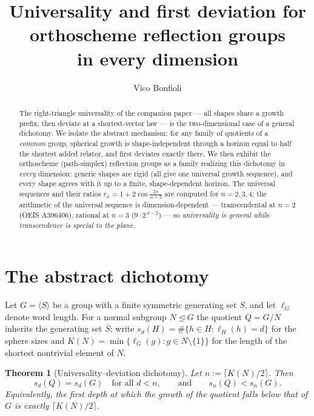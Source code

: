 \documentclass[11pt]{article}
\title{Universality and first deviation for orthoscheme reflection groups\\ in every dimension}
\author{Vico Bonfioli}
\date{}
\newtheorem{theorem}{Theorem}
\theoremstyle{definition}
\begin{document}
\maketitle

\begin{abstract}
\noindent The right-triangle universality of the companion paper --- all shapes share a
growth prefix, then deviate at a shortest-vector law --- is the two-dimensional case of a
general dichotomy. We isolate the abstract mechanism: for any family of quotients of a
\emph{common} group, spherical growth is shape-independent through a horizon equal to half the
shortest added relator, and first deviates exactly there. We then exhibit the orthoscheme
(path-simplex) reflection groups as a family realizing this dichotomy in \emph{every} dimension:
generic shapes are rigid (all give one universal growth sequence), and every shape agrees with it
up to a finite, shape-dependent horizon. The universal sequences and their ratios
$r_n = 1+2\cos\frac{2\pi}{n+3}$ are computed for $n=2,3,4$; the arithmetic of the universal
sequence is dimension-dependent --- transcendental at $n=2$ (\textup{OEIS A396406}), rational at
$n=3$ ($9\cdot2^{\,d-2}$) --- so \emph{universality is general while transcendence is special to
the plane}.
\end{abstract}

\section{The abstract dichotomy}

Let $G=\langle S\rangle$ be a group with a finite symmetric generating set $S$, and let
$\ell_G$ denote word length. For a normal subgroup $N\trianglelefteq G$ the quotient
$Q=G/N$ inherits the generating set $\bar S$; write $s_d(H)=\#\{h\in H:\ell_H(h)=d\}$ for the
sphere sizes and $K(N)=\min\{\ell_G(g):g\in N\setminus\{1\}\}$ for the length of the shortest
nontrivial element of $N$.

\begin{theorem}[Universality--deviation dichotomy]
\label{thm:dichotomy}
Let $n:=\big\lceil K(N)/2\big\rceil$. Then
\[
   s_d(Q)=s_d(G)\quad\text{for all } d<n,
   \qquad\text{and}\qquad
   s_n(Q)<s_n(G).
\]
Equivalently, the first depth at which the growth of the quotient falls below that of $G$ is
exactly $\big\lceil K(N)/2\big\rceil$.
\end{theorem}
\end{document}
